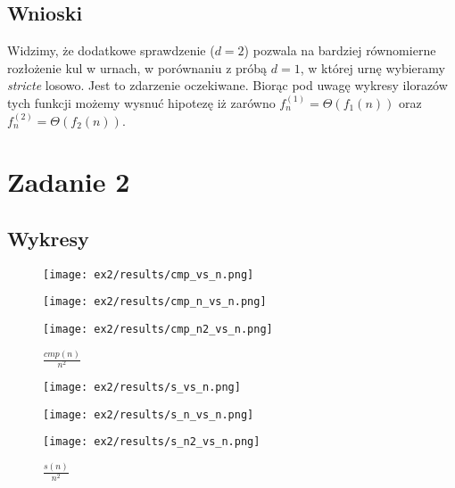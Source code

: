 \documentclass{article}
\begin{document}
\subsection{Wnioski}

Widzimy, że dodatkowe sprawdzenie ($d=2$) pozwala na bardziej równomierne rozłożenie kul w urnach, w porównaniu z próbą $d=1$, w której urnę wybieramy \textit{stricte} losowo. Jest to zdarzenie oczekiwane. Biorąc pod uwagę wykresy ilorazów tych funkcji możemy wysnuć hipotezę iż zarówno
$f_n^{(1)} = \Theta(f_1(n))$ oraz $f_n^{(2)} = \Theta(f_2(n))$.

\section{Zadanie 2}

\subsection{Wykresy}

\begin{figure}[H]
    \centering
        \begin{minipage}{0.24\textwidth}
        \centering
        \texttt{[image: ex2/results/cmp\_vs\_n.png]}
        \caption{$cmp(n)$}
    \end{minipage}
        \begin{minipage}{0.24\textwidth}
        \centering
        \texttt{[image: ex2/results/cmp\_n\_vs\_n.png]}
        \caption{$\frac{cmp(n)}{n}$}
    \end{minipage}
        \begin{minipage}{0.24\textwidth}
        \centering
        \texttt{[image: ex2/results/cmp\_n2\_vs\_n.png]}
        \caption{$\frac{cmp(n)}{n^2}$}
    \end{minipage}
\end{figure}

\begin{figure}[H]
    \centering
        \begin{minipage}{0.24\textwidth}
        \centering
        \texttt{[image: ex2/results/s\_vs\_n.png]}
        \caption{$s(n)$}
    \end{minipage}
        \begin{minipage}{0.24\textwidth}
        \centering
        \texttt{[image: ex2/results/s\_n\_vs\_n.png]}
        \caption{$\frac{s(n)}{n}$}
    \end{minipage}
        \begin{minipage}{0.24\textwidth}
        \centering
        \texttt{[image: ex2/results/s\_n2\_vs\_n.png]}
        \caption{$\frac{s(n)}{n^2}$}
    \end{minipage}
\end{figure}
\end{document}
